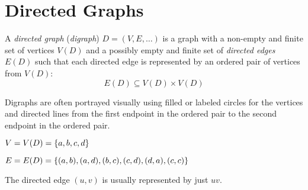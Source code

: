 \documentclass[letterpaper,12pt,fleqn]{article}
\begin{document}
\section*{Directed Graphs}

\begin{definition}
  A \emph{directed graph} (\emph{digraph}) \(D=(V,E,\ldots)\) is a graph with a non-empty and finite set of
  vertices \(V(D)\) and a possibly empty and finite set of \emph{directed edges} \(E(D)\) such that each directed
  edge is represented by an ordered pair of vertices from \(V(D)\):
  \[E(D)\subseteq V(D)\times V(D)\]
\end{definition}

\begin{example}
  Digraphs are often portrayed visually using filled or labeled circles for the vertices and directed lines from
  the first endpoint in the ordered pair to the second endpoint in the ordered pair.

  \begin{minipage}[t]{2.6in}
    \vspace{0cm}
  \end{minipage}
  \begin{minipage}[t]{3.7in}
    \vspace{0.5in}
    \(V=V(D)=\{a,b,c,d\}\)

    \(E=E(D)=\{(a,b),(a,d),(b,c),(c,d),(d,a),(c,c)\}\)
  \end{minipage}
\end{example}

\begin{notation}
  The directed edge \((u,v)\) is usually represented by just \(uv\).
\end{notation}
\end{document}
